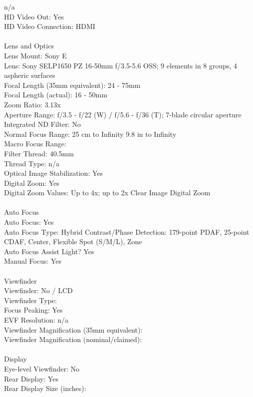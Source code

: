 \documentclass[12pt]{report}
\begin{document}
n/a
\\HD Video Out:
Yes
\\HD Video Connection:
HDMI
\\  \\Lens and Optics
\\Lens Mount:
Sony E
\\Lens:
Sony SELP1650 PZ 16-50mm f/3.5-5.6 OSS; 9 elements in 8 groups, 4 aspheric surfaces
\\Focal Length (35mm equivalent):
24 - 75mm 
\\Focal Length (actual):
16 - 50mm 
\\Zoom Ratio:
3.13x
\\Aperture Range:
f/3.5 - f/22 (W) / f/5.6 - f/36 (T); 7-blade circular aperture
\\Integrated ND Filter:
No
\\Normal Focus Range:
25 cm to Infinity
9.8 in to Infinity 
\\Macro Focus Range:
\\Filter Thread:
40.5mm
\\Thread Type:
n/a
\\Optical Image Stabilization:
Yes
\\Digital Zoom:
Yes
\\Digital Zoom Values:
Up to 4x; up to 2x Clear Image Digital Zoom
\\  \\Auto Focus
\\Auto Focus:
Yes
\\Auto Focus Type:
Hybrid Contrast/Phase Detection: 179-point PDAF, 25-point CDAF, Center, Flexible Spot (S/M/L), Zone
\\Auto Focus Assist Light?
Yes
\\Manual Focus:
Yes
\\  \\Viewfinder
\\Viewfinder:
No / LCD 
\\Viewfinder Type:
\\Focus Peaking:
Yes
\\EVF Resolution:
n/a 
\\Viewfinder Magnification (35mm equivalent):
\\Viewfinder Magnification (nominal/claimed):
\\  \\Display
\\Eye-level Viewfinder:
No
\\Rear Display:
Yes
\\Rear Display Size (inches):
\end{document}
